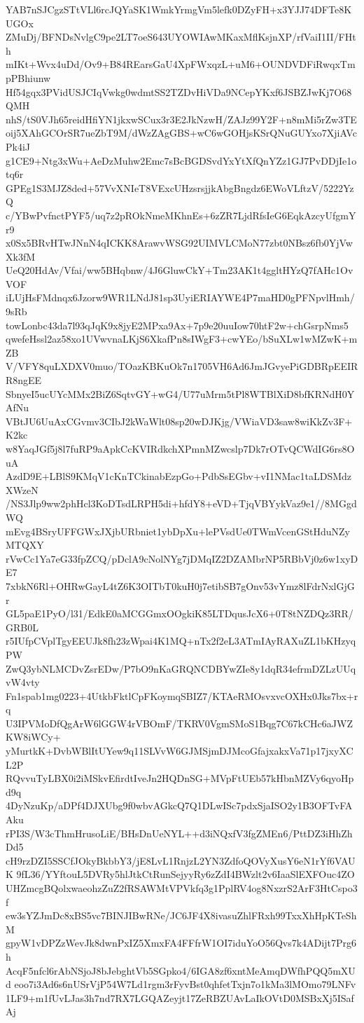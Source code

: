 YAB7nSJCgzSTtVLl6rcJQYaSK1WmkYrmgVm5lefk0DZyFH+x3YJJ74DFTe8KUGOx
ZMuDj/BFNDsNvlgC9pe2LT7oeS643UYOWIAwMKaxMflKsjnXP/rfVaiI1II/FHth
mIKt+Wvx4uDd/Ov9+B84REarsGaU4XpFWxqzL+uM6+OUNDVDFiRwqxTmpPBhiunw
Hf54gqx3PVidUSJCIqVwkg0wdmtSS2TZDvHiVDa9NCepYKxf6JSBZJwKj7O68QMH
nhS/tS0VJh65reidHfiYN1jkxwSCux3r3E2JkNzwH/ZAJz99Y2F+n8mMi5rZw3TE
oij5XAhGCOrSR7ueZbT9M/dWzZAgGBS+wC6wGOHjsKSrQNuGUYxo7XjiAVcPk4iJ
g1CE9+Ntg3xWu+AeDzMuhw2Emc7sBcBGDSvdYxYtXfQnYZz1GJ7PvDDjIe1otq6r
GPEg1S3MJZ8ded+57VvXNIeT8VExcUHzsrsjjkAbgBngdz6EWoVLftzV/5222YzQ
c/YBwPvfnctPYF5/uq7z2pROkNmeMKhnEs+6zZR7LjdRfsIeG6EqkAzcyUfgmYr9
x0Sx5BRvHTwJNnN4qICKK8ArawvWSG92UIMVLCMoN77zbt0NBsz6fb0YjVwXk3fM
UeQ20HdAv/Vfai/ww5BHqbnw/4J6GluwCkY+Tm23AK1t4ggltHYzQ7fAHc1OvVOF
iLUjHsFMdnqx6Jzorw9WR1LNdJ81sp3UyiERIAYWE4P7maHD0gPFNpvlHmh/9sRb
towLonbc43da7l93qJqK9x8jyE2MPxa9Ax+7p9e20uuIow70htF2w+chGsrpNms5
qwefeHssl2az58xo1UVwvnaLKjS6XkafPn8sIWgF3+cwYEo/bSuXLw1wMZwK+mZB
V/VFY8quLXDXV0muo/TOazKBKuOk7n1705VH6Ad6JmJGvyePiGDBRpEEIRR8ngEE
SbnyeI5ucUYcMMx2BiZ6SqtvGY+wG4/U77uMrm5tPl8WTBlXiD8bfKRNdH0YAfNu
VBtJU6UuAxCGvmv3CIbJ2kWaWlt08sp20wDJKjg/VWiaVD3saw8wiKkZv3F+K2kc
w8YaqJGf5j8l7fuRP9aApkCcKVIRdkchXPmnMZwcslp7Dk7rOTvQCWdIG6rs8OuA
AzdD9E+LBlS9KMqV1cKnTCkinabEzpGo+PdbSsEGbv+vI1NMac1taLDSMdzXWzeN
/NS3Jlp9ww2phHcl3KoDTsdLRPH5di+hfdY8+eVD+TjqVBYykVaz9e1//8MGgdWQ
mEvg4BSryUFFGWxJXjbURbniet1ybDpXu+lePVsdUe0TWmVcenGStHduNZyMTQXY
rVwCc1Ya7eG33fpZCQ/pDclA9cNolNYg7jDMqIZ2DZAMbrNP5RBbVj0z6w1xyDE7
7xbkN6Rl+OHRwGayL4tZ6K3OITbT0kuH0j7etibSB7gOnv53vYmz8lFdrNxlGjGr
GL5paE1PyO/l31/EdkE0aMCGGmxOOgkiK85LTDqusJcX6+0T8tNZDQz3RR/GRB0L
r5IUfpCVplTgyEEUJk8fh23zWpai4K1MQ+nTx2f2eL3ATmIAyRAXuZL1bKHzyqPW
ZwQ3ybNLMCDvZsrEDw/P7bO9nKaGRQNCDBYwZIe8y1dqR34efrmDZLzUUqvW4vty
Fn1spab1mg0223+4UtkbFktlCpFKoymqSBIZ7/KTAeRMOsvxvcOXHx0Jks7bx+rq
U3IPVMoDfQgArW6lGGW4rVBOmF/TKRV0VgmSMoS1Bqg7C67kCHc6aJWZKW8iWCy+
yMurtkK+DvbWBlItUYew9q11SLVvW6GJMSjmDJMcoGfajxakxVa71p17jxyXCL2P
RQvvuTyLBX0i2iMSkvEfirdtIveJn2HQDnSG+MVpFtUEb57kHbnMZVy6qyoHpd9q
4DyNzuKp/aDPf4DJXUbg9f0wbvAGkcQ7Q1DLwISc7pdxSjaISO2y1B3OFTvFAAku
rPI3S/W3cThmHrusoLiE/BHsDnUeNYL++d3iNQxfV3fgZMEn6/PttDZ3iHhZhDd5
cH9rzDZI5SSCfJOkyBkbbY3/jE8LvL1RnjzL2YN3ZdfoQOVyXusY6eN1rYf6VAUK
9fL36/YYftouL5DVRy5hlJtkCtRunSejyyRy6zZdI4BWzlt2v6IaaSlEXFOuc4ZO
UHZmcgBQolxwaeohzZuZ2fRSAWMtVPVkfq3g1PplRV4og8NxzrS2ArF3HtCspo3f
ew3sYZJmDc8xBS5vc7BINJIBwRNe/JC6JF4X8ivasuZhlFRxh99TxxXhHpKTeShM
gpyW1vDPZzWevJk8dwnPxIZ5XmxFA4FFfrW1OI7iduYoO56Qvs7k4ADijt7Prg6h
AcqF5nfcl6rAbNSjoJ8bJebghtVb5SGpko4/6IGA8zf6xntMeAmqDWfhPQQ5mXUd
eoo7i3Ad6s6nUSrVjP54W7Ld1rgm3rFyvBst0qhfetTxjn7o1kMa3lMOmo79LNFv
1LF9+m1fUvLJas3h7nd7RX7LGQAZeyjt17ZeRBZUAvLaIkOVtD0MSBxXj5ISafAj

